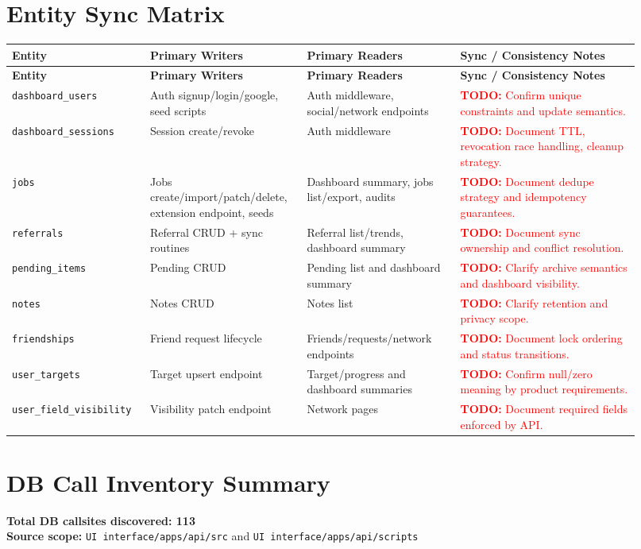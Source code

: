 \documentclass[11pt]{article}
\newcommand{\todoitem}[1]{\textcolor{red}{\textbf{TODO:} #1}}
\begin{document}
\section{Entity Sync Matrix}
\begin{longtable}{p{0.20\linewidth}p{0.22\linewidth}p{0.23\linewidth}p{0.27\linewidth}}
\toprule
\textbf{Entity} & \textbf{Primary Writers} & \textbf{Primary Readers} & \textbf{Sync / Consistency Notes} \\
\midrule
\endfirsthead
\toprule
\textbf{Entity} & \textbf{Primary Writers} & \textbf{Primary Readers} & \textbf{Sync / Consistency Notes} \\
\midrule
\endhead
\texttt{dashboard\_users} & Auth signup/login/google, seed scripts & Auth middleware, social/network endpoints & \todoitem{Confirm unique constraints and update semantics.} \\
\texttt{dashboard\_sessions} & Session create/revoke & Auth middleware & \todoitem{Document TTL, revocation race handling, cleanup strategy.} \\
\texttt{jobs} & Jobs create/import/patch/delete, extension endpoint, seeds & Dashboard summary, jobs list/export, audits & \todoitem{Document dedupe strategy and idempotency guarantees.} \\
\texttt{referrals} & Referral CRUD + sync routines & Referral list/trends, dashboard summary & \todoitem{Document sync ownership and conflict resolution.} \\
\texttt{pending\_items} & Pending CRUD & Pending list and dashboard summary & \todoitem{Clarify archive semantics and dashboard visibility.} \\
\texttt{notes} & Notes CRUD & Notes list & \todoitem{Clarify retention and privacy scope.} \\
\texttt{friendships} & Friend request lifecycle & Friends/requests/network endpoints & \todoitem{Document lock ordering and status transitions.} \\
\texttt{user\_targets} & Target upsert endpoint & Target/progress and dashboard summaries & \todoitem{Confirm null/zero meaning by product requirements.} \\
\texttt{user\_field\_visibility} & Visibility patch endpoint & Network pages & \todoitem{Document required fields enforced by API.} \\
\bottomrule
\end{longtable}

\section{DB Call Inventory Summary}
\textbf{Total DB callsites discovered: 113}\\
\textbf{Source scope:} \texttt{UI interface/apps/api/src} and \texttt{UI interface/apps/api/scripts}
\end{document}
